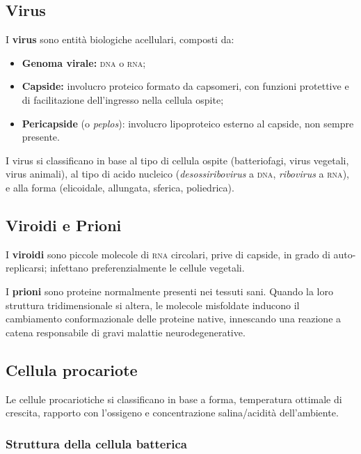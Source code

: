 \documentclass[11pt,a4paper,openright,twoside]{book}
\theoremstyle{definition}
\theoremstyle{plain}
\theoremstyle{remark}
\newcommand{\dna}{\textsc{dna}}
\newcommand{\rna}{\textsc{rna}}
\begin{document}
\subsection{Virus}

I \textbf{virus} sono entità biologiche acellulari, composti da:
\begin{itemize}
  \item \textbf{Genoma virale:} \dna{} o \rna{};
  \item \textbf{Capside:} involucro proteico formato da capsomeri, con funzioni protettive e di facilitazione dell'ingresso nella cellula ospite;
  \item \textbf{Pericapside} (o \textit{peplos}): involucro lipoproteico esterno al capside, non sempre presente.
\end{itemize}

I virus si classificano in base al tipo di cellula ospite (batteriofagi, virus vegetali, virus animali), al tipo di acido nucleico (\textit{desossiribovirus} a \dna, \textit{ribovirus} a \rna), e alla forma (elicoidale, allungata, sferica, poliedrica).

\subsection{Viroidi e Prioni}

I \textbf{viroidi} sono piccole molecole di \rna{} circolari, prive di capside, in grado di auto-replicarsi; infettano preferenzialmente le cellule vegetali.

I \textbf{prioni} sono proteine normalmente presenti nei tessuti sani. Quando la loro struttura tridimensionale si altera, le molecole misfoldate inducono il cambiamento conformazionale delle proteine native, innescando una reazione a catena responsabile di gravi malattie neurodegenerative.

\subsection{Cellula procariote}

Le cellule procariotiche si classificano in base a forma, temperatura ottimale di crescita, rapporto con l'ossigeno e concentrazione salina/acidità dell'ambiente.

\subsubsection{Struttura della cellula batterica}
\end{document}
